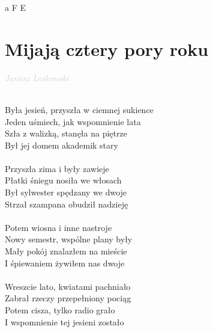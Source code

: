 \documentclass[a5paper, 10pt]{book}
\begin{document}
\begin{minipage}[t]{0.2\textwidth}
  a F E\\
\end{minipage}

\newpage
\section{Mijają cztery pory roku}\textcolor{lightgray}{\textit{Janusz Laskowski}}\\~\\
\begin{minipage}[t]{0.8\textwidth}
  Była jesień, przyszła w ciemnej sukience\\
  Jeden uśmiech, jak wspomnienie lata\\
  \hspace*{5mm}Szła z walizką, stanęła na piętrze\\
  \hspace*{5mm}Był jej domem akademik stary\\
  \\
  Przyszła zima i były zawieje\\
  Płatki śniegu nosiła we włosach\\
  \hspace*{5mm}Był sylwester spędzany we dwoje\\
  \hspace*{5mm}Strzał szampana obudził nadzieję\\
  \\
  Potem wiosna i inne nastroje\\
  Nowy semestr, wspólne plany były\\
  \hspace*{5mm}Mały pokój znalazłem na mieście\\
  \hspace*{5mm}I śpiewaniem żywiłem nas dwoje\\
  \\
  Wreszcie lato, kwiatami pachniało\\
  Zabrał rzeczy przepełniony pociąg\\
  \hspace*{5mm}Potem cisza, tylko radio grało\\
  \hspace*{5mm}I wspomnienie tej jesieni zostało\\
\end{minipage}
\end{document}

